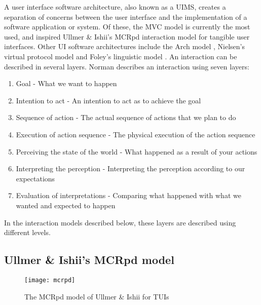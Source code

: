 
A user interface software architecture, also known as a \ac{UIMS}, creates a separation of concerns between the user interface and the implementation of a software application or system. Of these, the \ac{MVC} model is currently the most used, and inspired Ullmer \& Ishii's \cite{Ullmer2000} \ac{MCRpd} interaction model for tangible user interfaces. Other UI software architectures include the Arch model \cite{Bass1992}, Nielsen's virtual protocol model \cite{Nielsen1986} and Foley's linguistic model \cite{Foley1996}.
	An interaction can be described in several layers. Norman \cite{Norman1998} describes an interaction using seven layers:

\begin{enumerate}	
	\item Goal - What we want to happen
	\item Intention to act - An intention to act as to achieve the goal
	\item Sequence of action - The actual sequence of actions that we plan to do
	\item Execution of action sequence - The physical execution of the action sequence
	\item Perceiving the state of the world - What happened as a result of your actions
	\item Interpreting the perception - Interpreting the perception according to our expectations
	\item Evaluation of interpretations - Comparing what happened with what we wanted and expected to happen
\end{enumerate}
	

In the interaction models described below, these layers are described using different levels. 


\subsection{Ullmer \& Ishii's MCRpd model}

\begin{figure}
	\centering
	\centerline{\texttt{[image: mcrpd]}}
	\caption{The MCRpd model of Ullmer \& Ishii for \acp{TUI}}
	\label{mcrpd}
\end{figure}

